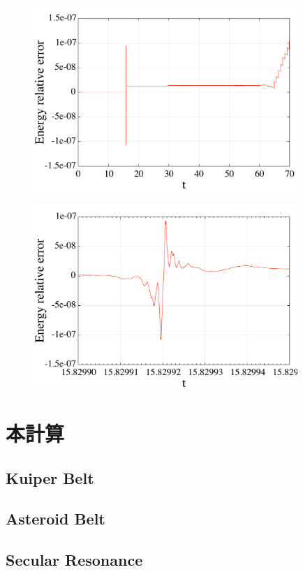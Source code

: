 \documentclass[11pt,a4paper,oneside,onecolumn]{jarticle}
\begin{document}
\begin{figure}[H]
\centering
\includegraphics[width=10cm]{./image/pythagoras_E_error.pdf}
\caption{\label{}}
\end{figure}

\begin{figure}[H]
\centering
\includegraphics[width=10cm]{./image/pythagoras_E_error_detail.pdf}
\caption{\label{}}
\end{figure}

\section{本計算}
\subsection{Kuiper Belt}



\subsection{Asteroid Belt}



\subsection{Secular Resonance}
\end{document}
